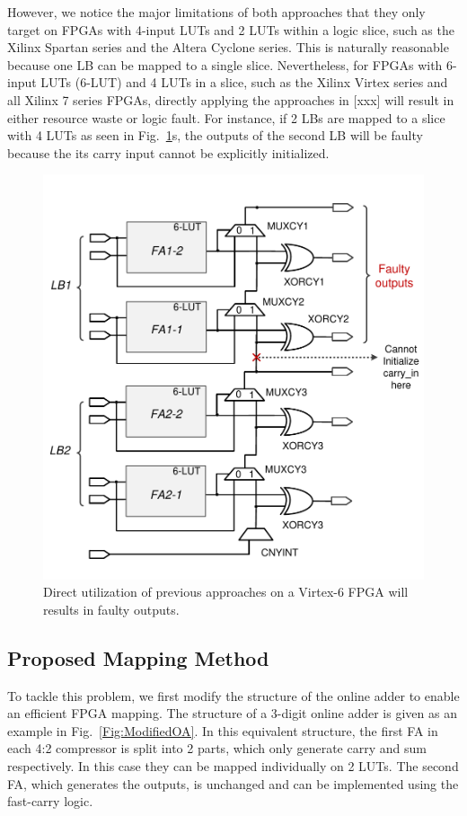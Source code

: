 \documentclass[conference]{IEEEtran}
\begin{document}
However, we notice the major limitations of both approaches that they only target on FPGAs with 4-input LUTs and 2 LUTs within a logic slice, such as the Xilinx Spartan series and the Altera Cyclone series. This is naturally reasonable because one LB can be mapped to a single slice. Nevertheless, for FPGAs with 6-input LUTs (6-LUT) and 4 LUTs in a slice, such as the Xilinx Virtex series and all Xilinx 7 series FPGAs, directly applying the approaches in [xxx] will result in either resource waste or logic fault. For instance, if 2 LBs are mapped to a slice with 4 LUTs as seen in Fig.~\ref{Fig:PreWorkVirtex6}s, the outputs of the second LB will be faulty because the its carry input cannot be explicitly initialized. 

\begin{figure}[htbp]
	\centering
	\includegraphics[width=.45\textwidth]{./Figures/SDadder_FastCarry_PreviousWork.pdf}
	\caption{Direct utilization of previous approaches on a Virtex-6 FPGA will results in faulty outputs.}
	\label{Fig:PreWorkVirtex6}
\end{figure}

\subsection{Proposed Mapping Method} 
To tackle this problem, we first modify the structure of the online adder to enable an efficient FPGA mapping. The structure of a 3-digit online adder is given as an example in Fig.~\ref{Fig:ModifiedOA}. In this equivalent structure, the first FA in each 4:2 compressor is split into 2 parts, which only generate carry and sum respectively. In this case they can be mapped individually on 2 LUTs. The second FA, which generates the outputs, is unchanged and can be implemented using the fast-carry logic.


\end{document}
